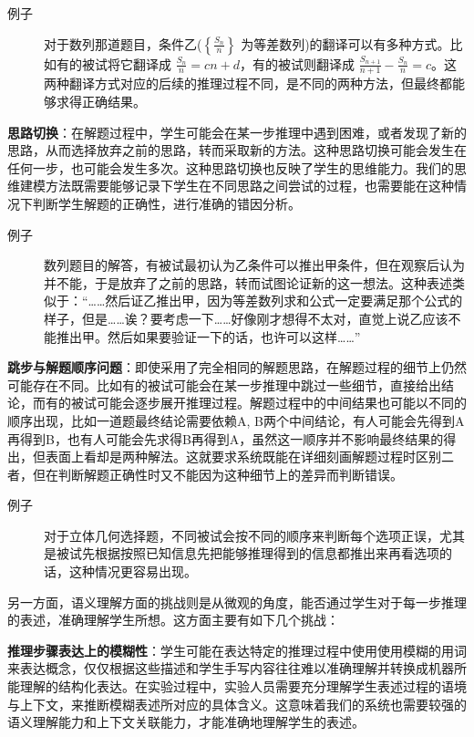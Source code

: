 \begin{description}
    \item[例子] 对于数列那道题目，条件乙($\left\{\frac{S_n}{n}\right\}$ 为等差数列)的翻译可以有多种方式。比如有的被试将它翻译成 $\frac{S_n}{n} = cn+d$，有的被试则翻译成 $\frac{S_{n+1}}{n+1} - \frac{S_n}{n} = c$。这两种翻译方式对应的后续的推理过程不同，是不同的两种方法，但最终都能够求得正确结果。
\end{description}

\textbf{思路切换}：在解题过程中，学生可能会在某一步推理中遇到困难，或者发现了新的思路，从而选择放弃之前的思路，转而采取新的方法。这种思路切换可能会发生在任何一步，也可能会发生多次。这种思路切换也反映了学生的思维能力。我们的思维建模方法既需要能够记录下学生在不同思路之间尝试的过程，也需要能在这种情况下判断学生解题的正确性，进行准确的错因分析。

\begin{description}
    \item[例子] 数列题目的解答，有被试最初认为乙条件可以推出甲条件，但在观察后认为并不能，于是放弃了之前的思路，转而试图论证新的这一想法。这种表述类似于：“……然后证乙推出甲，因为等差数列求和公式一定要满足那个公式的样子，但是……诶？要考虑一下……好像刚才想得不太对，直觉上说乙应该不能推出甲。然后如果要验证一下的话，也许可以这样……”
\end{description}

\textbf{跳步与解题顺序问题}：即使采用了完全相同的解题思路，在解题过程的细节上仍然可能存在不同。比如有的被试可能会在某一步推理中跳过一些细节，直接给出结论，而有的被试可能会逐步展开推理过程。解题过程中的中间结果也可能以不同的顺序出现，比如一道题最终结论需要依赖A, B两个中间结论，有人可能会先得到A再得到B，也有人可能会先求得B再得到A，虽然这一顺序并不影响最终结果的得出，但表面上看却是两种解法。这就要求系统既能在详细刻画解题过程时区别二者，但在判断解题正确性时又不能因为这种细节上的差异而判断错误。

\begin{description}
    \item[例子] 对于立体几何选择题，不同被试会按不同的顺序来判断每个选项正误，尤其是被试先根据按照已知信息先把能够推理得到的信息都推出来再看选项的话，这种情况更容易出现。
\end{description}

另一方面，语义理解方面的挑战则是从微观的角度，能否通过学生对于每一步推理的表述，准确理解学生所想。这方面主要有如下几个挑战：

\textbf{推理步骤表达上的模糊性}：学生可能在表达特定的推理过程中使用使用模糊的用词来表达概念，仅仅根据这些描述和学生手写内容往往难以准确理解并转换成机器所能理解的结构化表达。在实验过程中，实验人员需要充分理解学生表述过程的语境与上下文，来推断模糊表述所对应的具体含义。这意味着我们的系统也需要较强的语义理解能力和上下文关联能力，才能准确地理解学生的表述。

